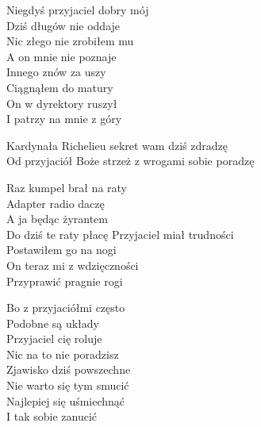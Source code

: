 \begin{text}
    Niegdyś przyjaciel dobry mój\\
    Dziś długów nie oddaje\\
    Nic złego nie zrobiłem mu\\
    A on mnie nie poznaje\\
    \vin Innego znów za uszy\\
    \vin Ciągnąłem do matury\\
    \vin On w dyrektory ruszył\\
    \vin I patrzy na mnie z góry

    Kardynała Richelieu sekret wam dziś zdradzę\\
    Od przyjaciół Boże strzeż z wrogami sobie poradzę

    Raz kumpel brał na raty\\
    Adapter radio daczę\\
    A ja będąc żyrantem\\
    Do dziś te raty płacę
    \vin Przyjaciel miał trudności\\
    \vin Postawiłem go na nogi\\
    \vin On teraz mi z wdzięczności\\
    \vin Przyprawić pragnie rogi

    Bo z przyjaciółmi często\\
    Podobne są układy\\
    Przyjaciel cię roluje\\
    Nic na to nie poradzisz\\
    \vin Zjawisko dziś powszechne\\
    \vin Nie warto się tym smucić\\
    \vin Najlepiej się uśmiechnąć\\
    \vin I tak sobie zanucić
\end{text}
\begin{chord}

\end{chord}